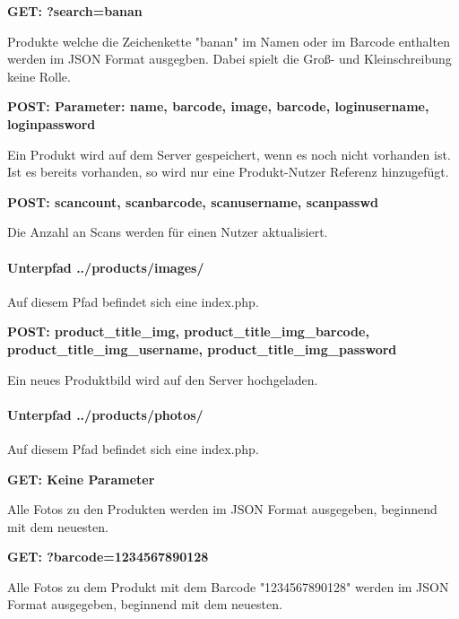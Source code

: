 \documentclass{scrartcl}
\begin{document}
\noindent \textbf{GET: ?search=banan}

\noindent Produkte welche die Zeichenkette "banan" im Namen oder im Barcode enthalten werden im JSON Format ausgegben. Dabei spielt die Groß- und Kleinschreibung keine Rolle. \newline

\noindent \textbf{POST: Parameter: name, barcode, image, barcode, loginusername, loginpassword}

\noindent Ein Produkt wird auf dem Server gespeichert, wenn es noch nicht vorhanden ist. Ist es bereits vorhanden, so wird nur eine Produkt-Nutzer Referenz hinzugefügt. \newline

\noindent \textbf{POST: scancount, scanbarcode, scanusername, scanpasswd}

\noindent Die Anzahl an Scans werden für einen Nutzer aktualisiert.

\paragraph{Unterpfad ../products/images/}
Auf diesem Pfad befindet sich eine index.php. \newline 

\noindent \textbf{POST: product\_title\_img, product\_title\_img\_barcode, \newline  product\_title\_img\_username, product\_title\_img\_password}

\noindent Ein neues Produktbild wird auf den Server hochgeladen.

\newpage

\paragraph{Unterpfad ../products/photos/}
Auf diesem Pfad befindet sich eine index.php. \newline 

\noindent \textbf{GET: Keine Parameter}

\noindent Alle Fotos zu den Produkten werden im JSON Format ausgegeben, beginnend mit dem neuesten. \newline 

\noindent \textbf{GET: ?barcode=1234567890128}

\noindent Alle Fotos zu dem Produkt mit dem Barcode "1234567890128" werden im JSON Format ausgegeben, beginnend mit dem neuesten. \newline 
\end{document}
